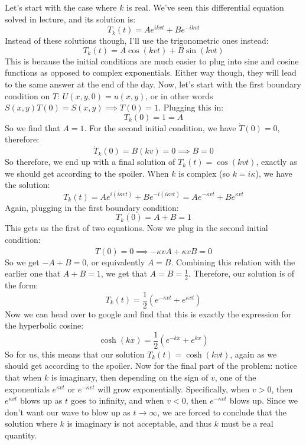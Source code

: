 \documentclass{article}
\begin{document}
\begin{solution}
	Let's start with the case where $k$ is real. We've seen this differential equation solved in lecture, 
	and its solution is:
	\[
		T_k(t) = Ae^{ikvt} + Be^{-ikvt}
	\] 
	Instead of these solutions though, I'll use the trigonometric ones instead:
	\[
	T_k(t) = A\cos(kvt) + B \sin(kvt)
	\] 
	This is because the initial conditions are much easier to plug into sine and cosine functions as opposed
	to complex exponentials. Either way though, they will lead to the same answer at the end of the day. 
	Now, let's start with the first boundary condition on $T$: $U(x, y, 0) = u(x, y)$, or in other words 
	$S(x, y) T(0) = S(x, y) \implies T(0) = 1$. Plugging this in:
	\[
	T_k(0) = 1 = A
	\] 
	So we find that $A = 1$. For the second initial condition, we have $\dot T(0) = 0$, therefore:
	\[
		\dot T_k(0) = B(kv) = 0 \implies B = 0
	\] 
	So therefore, we end up with a final solution of $T_k(t) = \cos(kvt)$, exactly as we should get
	according to the spoiler. When $k$ is complex (so $k = i\kappa$), we have the solution:
	\[
		T_k(t) = Ae^{i(i \kappa vt)} + Be^{-i(i \kappa vt)} = Ae^{-\kappa vt} + Be^{\kappa vt}
	\] 
	Again, plugging in the first boundary condition:
	\[
	T_k(0) = A + B = 1 
	\] 
	This gets us the first of two equations. Now we plug in the second initial condition:
	\[
	\dot T(0) = 0 \implies -\kappa vA + \kappa vB = 0
	\] 
	So we get $-A + B = 0$, or equivalently $A = B$. Combining this relation with the earlier one that $A + B 
	= 1$, we get that $A = B = \frac{1}{2}$. Therefore, our solution is of the form:
	\[
		T_k(t) = \frac{1}{2}\left( e^{-\kappa vt} + e^{\kappa vt} \right) 
	\] 
	Now we can head over to google and find that this is exactly the expression for the hyperbolic cosine:
	\[
		\cosh(kx) =\frac{1}{2}\left( e^{-kx} + e^{kx} \right) 
	\] 
	So for us, this means that our solution $T_k(t) = \cosh(kvt)$, again as we should get according to the 
	spoiler. Now for the final part of the problem: notice that when $k$ is imaginary, then depending on 
	the sign of $v$, one of the exponentials $e^{\kappa vt}$ or $e^{-\kappa vt}$ will grow exponentially.
	Specifically, 
	when $v > 0$, then $e^{\kappa vt}$ blows up as $t$ goes to infinity, and when $v < 0$, then 
	$e^{-\kappa vt}$ blows up. Since we don't want our wave to blow up as $t \to \infty$, we are forced to
	conclude that 
	the solution where $k$ is imaginary is not acceptable, and thus $k$ must be a real quantity.
\end{solution}

\phline
\end{document}

